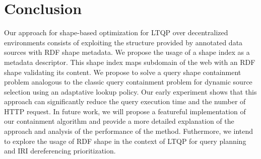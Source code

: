 \section{Conclusion}
Our approach for shape-based optimization for LTQP over decentralized environments consists of exploiting the structure provided by
annotated data sources with RDF shape metadata. 
We propose the usage of a shape index as a metadata descriptor.
This shape index maps subdomain of the web with an RDF shape validating its content.
We propose to solve a query shape containment problem analogous to the classic query containment problem for dynamic source selection
using an adaptative lookup policy. 
Our early experiment shows that this approach can significantly reduce the query execution time and the number of HTTP request.
In future work, we will propose a featureful implementation of our containment algorithm and provide a more
detailed explanation of the approach and analysis of the performance of the method.
Futhermore, we intend to explore the usage of RDF shape in the context of LTQP for query planning and IRI dereferencing prioritization.